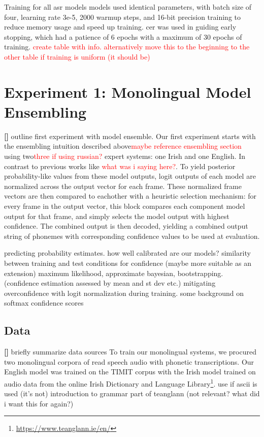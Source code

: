 \documentclass[thesis]{cluu}
\newcounter{paranum}
\newcommand{\numberedparagraph}{\par\refstepcounter{paranum}\textbf{[\theparanum] }}
\newcommand{\todo}[1]{\textcolor{red}{#1}}
\begin{document}
Training for all \gls{asr} models models used identical parameters, with batch size of four, learning rate 3e-5, 2000 warmup steps, and 16-bit precision training to reduce memory usage and speed up training. \gls{cer} was used in guiding early stopping, which had a patience of 6 epochs with a maximum of 30 epochs of training. \todo{create table with info. alternatively move this to the beginning to the other table if training is uniform (it should be)}

\section{Experiment 1: Monolingual Model Ensembling} \label{ex:1}
\numberedparagraph{outline first experiment with model ensemble.}
Our first experiment starts with the ensembling intuition described above\todo{maybe reference ensembling section} using two\todo{three if using russian?} expert systems: one Irish and one English. In contrast to previous works like \textcite{dengEnsembleDeepLearning2014}\todo{what was i saying here?}. To yield posterior probability-like values from these model outputs, logit outputs of each model are normalized across the output vector for each frame. These normalized frame vectors are then compared to eachother with a heuristic selection mechanism: for every frame in the output vector, this block compares each component model output for that frame, and simply selects the model output with highest confidence. The combined output is then decoded, yielding a combined output string of phonemes with corresponding confidence values to be used at evaluation.

\textcite{guoCalibrationModernNeural2017} predicting probability estimates. how well calibrated are our models?
\textcite{niehuesModelingConfidenceSequencetoSequence2019} similarity between training and test conditions for confidence (maybe more suitable as an extension)
\textcite{papadopoulosConfidenceEstimationMethods2001} maximum likelihood, approximate bayesian, bootstrapping. (confidence estimation assessed by mean and st dev etc.)
\textcite{weiMitigatingNeuralNetwork2022} mitigating overconfidence with logit normalization during training. some background on softmax confidence scores

\subsection{Data}
\numberedparagraph{briefly summarize data sources}
To train our monolingual systems, we procured two monolingual corpora of read speech audio with phonetic transcriptions. Our English model was trained on the TIMIT corpus \textcite{garofolo1993timit} with the Irish model trained on audio data from the online Irish Dictionary and Language Library\footnote{\url{https://www.teanglann.ie/en/}}. 
\textcite{krishenbaumRepresentingIPAPhonetics} use if ascii is used (it's not)
\textcite{mechuraIntroductionGramadanIrish} introduction to grammar part of teanglann (not relevant? what did i want this for again?)
\end{document}
